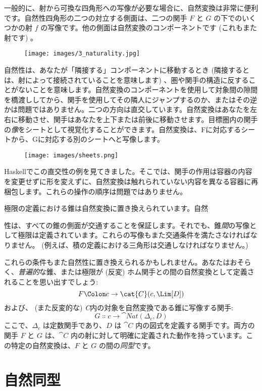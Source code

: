 一般的に、射から可換な四角形への写像が必要な場合に、自然変換は非常に便利です。自然性四角形の二つの対立する側面は、二つの関手 $F$ と $G$ の下でのいくつかの射 $f$ の写像です。他の側面は自然変換のコンポーネントです (これもまた射です) 。

\begin{figure}[H]
  \centering
  \texttt{[image: images/3\_naturality.jpg]}
\end{figure}

\noindent
自然性は、あなたが「隣接する」コンポーネントに移動するとき (隣接するとは、射によって接続されていることを意味します) 、圏や関手の構造に反することがないことを意味します。自然変換のコンポーネントを使用して対象間の隙間を橋渡ししてから、関手を使用してその隣人にジャンプするのか、またはその逆かは問題ではありません。二つの方向は直交しています。自然変換はあなたを左右に移動させ、関手はあなたを上下または前後に移動させます。目標圏内の関手の\emph{像}をシートとして視覚化することができます。自然変換は、Fに対応するシートから、Gに対応する別のシートへと写像します。

\begin{figure}[H]
  \centering
  \texttt{[image: images/sheets.png]}
\end{figure}

\noindent
Haskellでこの直交性の例を見てきました。そこでは、関手の作用は容器の内容を変更せずに形を変えずに、自然変換は触れられていない内容を異なる容器に再梱包します。これらの操作の順序は問題ではありません。

極限の定義における錐は自然変換に置き換えられています。自然

性は、すべての錐の側面が交通することを保証します。それでも、錐\emph{間}の写像として極限は定義されています。これらの写像もまた交通条件を満たさなければなりません。 (例えば、積の定義における三角形は交通しなければなりません。) 

これらの条件もまた自然性に置き換えられるかもしれません。あなたはおそらく、\emph{普遍的}な錐、または極限が (反変) ホム関手との間の自然変換として定義されることを思い出すでしょう: 
\[F \Colon c \to \cat{C}(c, \Lim[D])\]
および、 (また反変的な) \emph{C}内の対象を自然変換である錐に写像する関手: 
\[G \Colon c \to \cat{Nat}(\Delta_c, D)\]
ここで、$\Delta_c$ は定数関手であり、$D$ は $\cat{C}$ 内の図式を定義する関手です。両方の関手 $F$ と $G$ は、$\cat{C}$ 内の射に対して明確に定義された動作を持っています。この特定の自然変換は、$F$ と $G$ の間の\emph{同型}です。

\section{自然同型}

